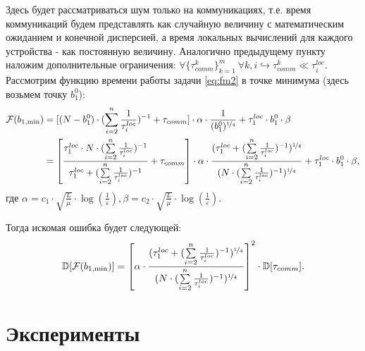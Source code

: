 \documentclass{article}
\theoremstyle{definition}
\theoremstyle{plain}
\begin{document}
Здесь будет рассматриваться шум только на коммуникациях, т.е. время коммуникаций будем представлять как случайную величину с математическим ожиданием и конечной дисперсией, а время локальных вычислений для каждого устройства - как постоянную величину. Аналогично предыдущему пункту наложим дополнительные ограничения: $\forall \{\tau_{comm}^k\}_{k = 1}^m~\forall k, i \hookrightarrow \tau_{comm}^k \ll \tau_{i}^{loc}$. Рассмотрим функцию времени работы задачи \eqref{eq:fm2} в точке минимума (здесь возьмем точку $b_1^0$):
\begin{eqnarray*}
    \begin{split}
        \mathcal{F}(b_{1, {\min}}) &= [(N - b_1^0)\cdot(\sum\limits_{i = 2}^n \frac{1}{\tau_i^{loc}})^{-1} + \tau_{comm}]\cdot\alpha\cdot\frac{1}{(b_1^0)^{\nicefrac{1}{4}}} + \tau_1^{loc}\cdot b_1^0\cdot\beta 
        \\ &=
        \left[\frac{\tau_1^{loc}\cdot N\cdot (\sum\limits_{i = 2}^n \frac{1}{\tau_i^{loc}})^{-1}}{\tau_1^{loc} + (\sum\limits_{i = 2}^n \frac{1}{\tau_i^{loc}})^{-1}} + \tau_{comm}\right]\cdot\alpha\cdot\frac{(\tau_1^{loc} + (\sum\limits_{i = 2}^n \frac{1}{\tau_i^{loc}})^{-1})^{\nicefrac{1}{4}}}{(N\cdot (\sum\limits_{i = 2}^n \frac{1}{\tau_i^{loc}})^{-1})^{\nicefrac{1}{4}}} + \tau_1^{loc}\cdot b_1^0\cdot\beta,
    \end{split}
\end{eqnarray*}
где $\alpha = c_1\cdot\sqrt{\frac{L}{\mu}}\cdot \log(\frac{1}{\varepsilon}),\beta = c_2\cdot\sqrt{\frac{L}{\mu}}\cdot \log(\frac{1}{\varepsilon}) $.

Тогда искомая ошибка будет следующей:
\begin{equation*}
    \label{eq:20}
    \mathbb D [\mathcal{F}(b_{1, {\min}})] = \left[\alpha\cdot\frac{(\tau_1^{loc} + (\sum\limits_{i = 2}^n \frac{1}{\tau_i^{loc}})^{-1})^{\nicefrac{1}{4}}}{(N\cdot (\sum\limits_{i = 2}^n \frac{1}{\tau_i^{loc}})^{-1})^{\nicefrac{1}{4}}}\right]^2\cdot \mathbb D [\tau_{comm}].
\end{equation*}


\section{Эксперименты}
\end{document}
